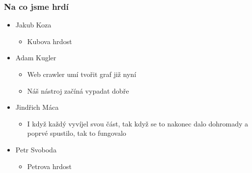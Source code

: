 \documentclass{beamer}
\begin{document}
\begin{frame}[allowframebreaks]\frametitle{Na co jsme hrdí} 
  \begin{itemize}
    \item Jakub Koza
      \begin{itemize}
       \item Kubova hrdost
     \end{itemize}
   
    \item Adam Kugler
      \begin{itemize}
       \item Web crawler umí tvořit graf již nyní
       \item Náš nástroj začíná vypadat dobře
     \end{itemize}

    \item Jindřich Máca
      \begin{itemize}
       \item I když každý vyvíjel svou část, tak když se to nakonec dalo dohromady a poprvé spustilo, tak to fungovalo
      \end{itemize}  
   
    \item Petr Svoboda
      \begin{itemize}
       \item Petrova hrdost
     \end{itemize}
   \end{itemize}  
\end{frame}
\end{document}
